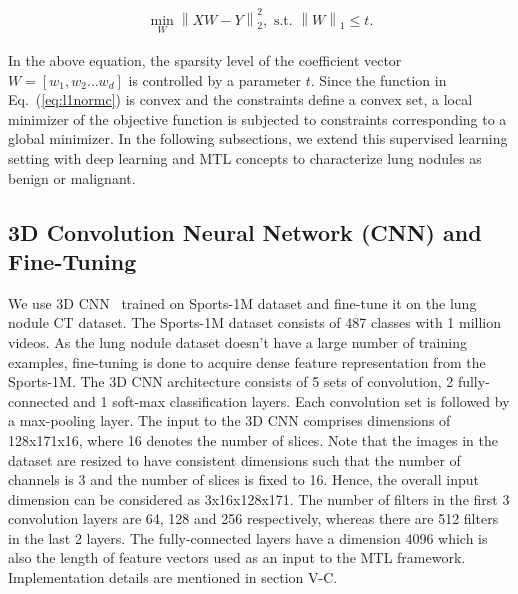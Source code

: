 \documentclass[journal]{IEEEtran}
\DeclareMathOperator*{\minimum}{min}
\begin{document}
\begin{equation}
\begin{split}
\minimum_{W}  \left \|XW-Y  \right \|_{2}^{2},
\text{ s.t. }   \left \| W \right \|_1 \leq t.
\end{split}
\label{eq:l1normc}
\end{equation}

In the above equation, the sparsity level of the coefficient vector $W=[w_1,w_2 \dots w_d]$ is controlled by a parameter $t$. Since the function in Eq.~(\ref{eq:l1normc}) is convex and the constraints define a convex set, a local minimizer of the objective function is subjected to constraints corresponding to a global minimizer. In the following subsections, we extend this supervised learning setting with deep learning and MTL concepts to characterize lung nodules as benign or malignant.

\subsection{3D Convolution Neural Network (CNN) and Fine-Tuning}
We use 3D CNN~\cite{tran2015learning} trained on Sports-1M dataset \cite{karpathy2014large} and fine-tune it on the lung nodule CT dataset. The Sports-1M dataset consists of 487 classes with 1 million videos. As the lung nodule dataset doesn't have a large number of training examples, fine-tuning is done to acquire dense feature representation from the Sports-1M. The 3D CNN architecture consists of 5 sets of convolution, 2 fully-connected and 1 soft-max classification layers. Each convolution set is followed by a max-pooling layer. The input to the 3D CNN comprises dimensions of 128x171x16, where 16 denotes the number of slices. Note that the images in the dataset are resized to have consistent dimensions such that the number of channels is 3 and the number of slices is fixed to 16. Hence, the overall input dimension can be considered as 3x16x128x171. The number of filters in the first 3 convolution layers are 64, 128 and 256 respectively, whereas there are 512 filters in the last 2 layers. The fully-connected layers have a dimension 4096 which is also the length of feature vectors used as an input to the MTL framework. Implementation details are mentioned in section V-C.
%
\end{document}
